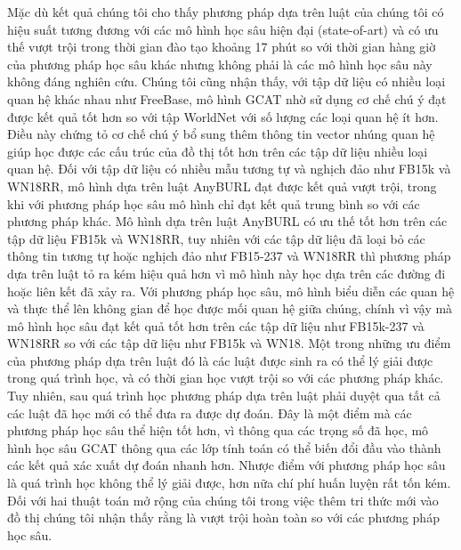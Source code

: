 Mặc dù kết quả chúng tôi cho thấy phương pháp dựa trên luật của chúng tôi có hiệu suất tương đương với các mô hình học sâu hiện đại (state-of-art) và có ưu thế vượt trội trong thời gian đào tạo khoảng 17 phút so với thời gian hàng giờ của phương pháp học sâu khác nhưng không phải là các mô hình học sâu này không đáng nghiên cứu. Chúng tôi cũng nhận thấy, với tập dữ liệu có nhiều loại quan hệ khác nhau như FreeBase, mô hình GCAT nhờ sử dụng cơ chế chú ý đạt được kết quả tốt hơn so với tập WorldNet với số lượng các loại quan hệ ít hơn.
Điều này chứng tỏ cơ chế chú ý bổ sung thêm thông tin vector nhúng quan hệ giúp học được các cấu trúc của đồ thị tốt hơn trên các tập dữ liệu nhiều loại quan hệ.
Đối với tập dữ liệu có nhiều mẫu tương tự và nghịch đảo như FB15k và WN18RR, mô hình dựa trên luật AnyBURL đạt được kết quả vượt trội, trong khi với phương pháp học sâu mô hình chỉ đạt kết quả trung bình so với các phương pháp khác.
Mô hình dựa trên luật AnyBURL có ưu thế tốt hơn trên các tập dữ liệu FB15k và WN18RR, tuy nhiên với các tập dữ liệu đã loại bỏ các thông tin tương tự hoặc nghịch đảo như FB15-237 và WN18RR thì phương pháp dựa trên luật tỏ ra kém hiệu quả hơn vì mô hình này học dựa trên các đường đi hoặc liên kết đã xảy ra. Với phương pháp học sâu, mô hình biểu diễn các quan hệ và thực thể lên không gian để học được mối quan hệ giữa chúng, chính vì vậy mà mô hình học sâu đạt kết quả tốt hơn trên các tập dữ liệu như FB15k-237 và WN18RR so với các tập dữ liệu như FB15k và WN18.
Một trong những ưu điểm của phương pháp dựa trên luật đó là các luật được sinh ra có thể lý giải được trong quá trình học, và có thời gian học vượt trội so với các phương pháp khác. Tuy nhiên, sau quá trình học phương pháp dựa trên luật phải duyệt qua tất cả các luật đã học mới có thể đưa ra được dự đoán. Đây là một điểm mà các phương pháp học sâu thể hiện tốt hơn, vì thông qua các trọng số đã học, mô hình học sâu GCAT thông qua các lớp tính toán có thể biến đổi đầu vào thành các kết quả xác xuất dự đoán nhanh hơn. Nhược điểm với phương pháp học sâu là quá trình học không thể lý giải được, hơn nữa chí phí huấn luyện rất tốn kém. Đối với hai thuật toán mở rộng của chúng tôi trong việc thêm tri thức mới vào đồ thị chúng tôi nhận thấy rằng là vượt trội hoàn toàn so với các phương pháp học sâu.

